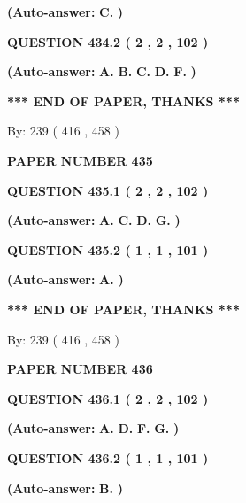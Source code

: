 \documentclass[12pt]{article}
\begin{document}
 
{\textbf{(Auto-answer:}}
{\textbf{\large{
C.}}}
{\textbf{)}}
 
 
  
  
{\textbf{\large{QUESTION
434.2 
 ( 2 , 2 , 102 )
}}}
 
 
{\textbf{(Auto-answer:}}
{\textbf{\large{
A.}}}
{\textbf{\large{
B.}}}
{\textbf{\large{
C.}}}
{\textbf{\large{
D.}}}
{\textbf{\large{
F.}}}
{\textbf{)}}
 
 
   
   
\vspace{1.0in} 
{\textbf{\large{ *** END OF PAPER, THANKS *** }}} 
   
   
\hspace{1.0in} By: 
 239 ( 416 ,  458 )
   
   
   
   
\newpage 
\setcounter{page}{ 
   435001 } 
   
   
 {\textbf{ \Large{ PAPER NUMBER  435  }}}
   
   
  
  
{\textbf{\large{QUESTION
435.1 
 ( 2 , 2 , 102 )
}}}
 
 
{\textbf{(Auto-answer:}}
{\textbf{\large{
A.}}}
{\textbf{\large{
C.}}}
{\textbf{\large{
D.}}}
{\textbf{\large{
G.}}}
{\textbf{)}}
 
 
  
  
{\textbf{\large{QUESTION
435.2 
 ( 1 , 1 , 101 )
}}}
 
 
{\textbf{(Auto-answer:}}
{\textbf{\large{
A.}}}
{\textbf{)}}
 
 
   
   
\vspace{1.0in} 
{\textbf{\large{ *** END OF PAPER, THANKS *** }}} 
   
   
\hspace{1.0in} By: 
 239 ( 416 ,  458 )
   
   
   
   
\newpage 
\setcounter{page}{ 
   436001 } 
   
   
 {\textbf{ \Large{ PAPER NUMBER  436  }}}
   
   
  
  
{\textbf{\large{QUESTION
436.1 
 ( 2 , 2 , 102 )
}}}
 
 
{\textbf{(Auto-answer:}}
{\textbf{\large{
A.}}}
{\textbf{\large{
D.}}}
{\textbf{\large{
F.}}}
{\textbf{\large{
G.}}}
{\textbf{)}}
 
 
  
  
{\textbf{\large{QUESTION
436.2 
 ( 1 , 1 , 101 )
}}}
 
 
{\textbf{(Auto-answer:}}
{\textbf{\large{
B.}}}
{\textbf{)}}
 
\end{document}
